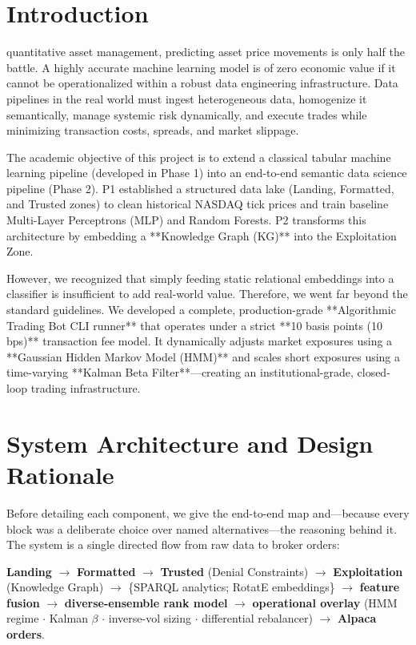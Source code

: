 \documentclass[10pt,journal,compsoc]{IEEEtran}
\begin{document}
\maketitle
\IEEEdisplaynontitleabstractindextext
\IEEEpeerreviewmaketitle

\section{Introduction}
 quantitative asset management, predicting asset price movements is only half the battle. A highly accurate machine learning model is of zero economic value if it cannot be operationalized within a robust data engineering infrastructure. Data pipelines in the real world must ingest heterogeneous data, homogenize it semantically, manage systemic risk dynamically, and execute trades while minimizing transaction costs, spreads, and market slippage.

The academic objective of this project is to extend a classical tabular machine learning pipeline (developed in Phase 1) into an end-to-end semantic data science pipeline (Phase 2). P1 established a structured data lake (Landing, Formatted, and Trusted zones) to clean historical NASDAQ tick prices and train baseline Multi-Layer Perceptrons (MLP) and Random Forests. P2 transforms this architecture by embedding a **Knowledge Graph (KG)** into the Exploitation Zone. 

However, we recognized that simply feeding static relational embeddings into a classifier is insufficient to add real-world value. Therefore, we went far beyond the standard guidelines. We developed a complete, production-grade **Algorithmic Trading Bot CLI runner** that operates under a strict **10 basis points (10 bps)** transaction fee model. It dynamically adjusts market exposures using a **Gaussian Hidden Markov Model (HMM)** and scales short exposures using a time-varying **Kalman Beta Filter**—creating an institutional-grade, closed-loop trading infrastructure.

\section{System Architecture and Design Rationale}
\label{sec:arch}
Before detailing each component, we give the end-to-end map and---because every block was a deliberate choice over named alternatives---the reasoning behind it. The system is a single directed flow from raw data to broker orders:
\begin{center}
\small
\textbf{Landing} $\to$ \textbf{Formatted} $\to$ \textbf{Trusted} (Denial Constraints) $\to$ \textbf{Exploitation} (Knowledge Graph) $\to$ \{SPARQL analytics; RotatE embeddings\} $\to$ \textbf{feature fusion} $\to$ \textbf{diverse-ensemble rank model} $\to$ \textbf{operational overlay} (HMM regime $\cdot$ Kalman $\beta$ $\cdot$ inverse-vol sizing $\cdot$ differential rebalancer) $\to$ \textbf{Alpaca orders}.
\end{center}
\end{document}
